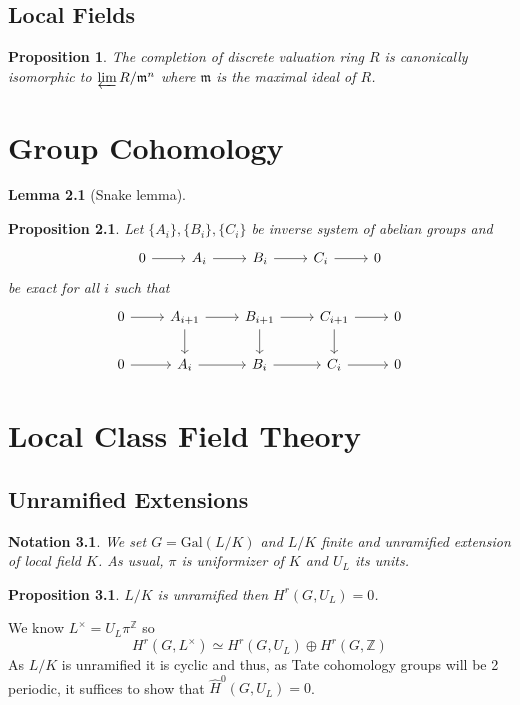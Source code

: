 \documentclass[twoside, 12pt]{iiser-thesis}
\newtheorem{prop}[thm]{ Proposition}
\newtheorem{lem}[thm]{ Lemma}
\newtheorem{notation}{ Notation}[section]
\newcommand{\Z}{\mathbb{Z}}
\begin{document}
\section{Local Fields}
\begin{prop}
The completion of discrete valuation ring $R$ is canonically isomorphic to $\varprojlim R/ \mathfrak m ^n$ where $\mathfrak m$ is the maximal ideal of $R$.
\end{prop}
\chapter{Group Cohomology}
\begin{lem}[Snake lemma]
\end{lem}
\begin{prop}
Let $\{A_i\},\{B_i\}, \{C_i\}$ be inverse system of abelian groups and \[ \begin{tikzcd}
0 \arrow[r] & A_i \arrow[r] & B_i \arrow[r] & C_i \arrow[r] & 0 
\end{tikzcd}\] be exact for all $i$ such that 
\[ \begin{tikzcd}
 0 \arrow [r] & A_{i+1} \arrow[r] \arrow[d] & B_{i+1} \arrow[d] \arrow[r] & C_{i+1} \arrow[r] \arrow[d] & 0 \\
0 \arrow[r] & A_i \arrow[r] & B_i \arrow[r] & C_i \arrow[r] & 0
\end{tikzcd} \]
\end{prop}

\chapter{Local Class Field Theory}

\section{Unramified Extensions}\label{sec1}
\begin{notation} 
We set $G= \text{Gal} (L/K)$ and $L/K$ finite and unramified extension of local field $K$. As usual, $\pi$ is uniformizer of $K$ and $U_L$ its units.
    
\end{notation} 
\begin{prop}
$L/K$ is unramified then $H^r(G,U_L)=0$.
\end{prop}
We know $ L^\times =U_L \pi ^ \mathbb  Z$ so $$H^r(G, L^\times ) \simeq H^r(G, U_L) \oplus H^r(G, \Z)$$
As $L/K$ is unramified it is cyclic and thus, as Tate cohomology groups will be 2 periodic, it suffices to show that $\hat H ^0 (G, U_L) =0$.
\end{document}

